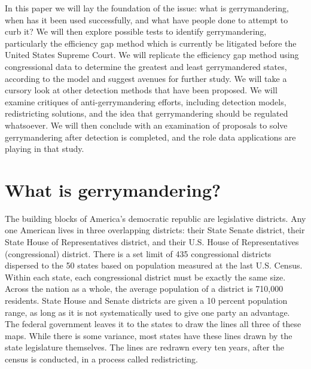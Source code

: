 \documentclass[sigconf]{acmart}
\begin{document}
In this paper we will lay the foundation of the issue: what is gerrymandering, when has it been used successfully, and what have people done to attempt to curb it? We will then explore possible tests to identify gerrymandering, particularly the efficiency gap method which is currently be litigated before the United States Supreme Court. We will replicate the efficiency gap method using congressional data to determine the greatest and least gerrymandered states, according to the model and suggest avenues for further study. We will take a cursory look at other detection methods that have been proposed. We will examine critiques of anti-gerrymandering efforts, including detection models, redistricting solutions, and the idea that gerrymandering should be regulated whatsoever. We will then conclude with an examination of proposals to solve gerrymandering after detection is completed, and the role data applications are playing in that study.

\section{What is gerrymandering?}
The building blocks of America's democratic republic are legislative districts. Any one American lives in three overlapping districts: their State Senate district, their State House of Representatives district, and their U.S. House of Representatives (congressional) district. There is a set limit of 435 congressional districts dispersed to the 50 states based on population measured at the last U.S. Census. Within each state, each congressional district must be exactly the same size. Across the nation as a whole, the average population of a district is 710,000 residents. State House and Senate districts are given a 10 percent population range, as long as it is not systematically used to give one party an advantage. The federal government leaves it to the states to draw the lines all three of these maps. While there is some variance, most states have these lines drawn by the state legislature themselves. The lines are redrawn every ten years, after the census is conducted, in a process called redistricting.\cite{maps}\cite{population}\cite{govtrack}
\end{document}
